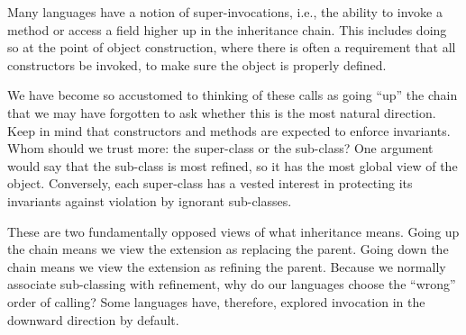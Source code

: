 
Many languages have a notion of super-invocations, i.e., the ability to invoke a
method or access a field higher up in the inheritance chain. This includes doing
so at the point of object construction, where there is often a requirement that
all constructors be invoked, to make sure the object is properly defined.

We have become so accustomed to thinking of these calls as going “up” the chain
that we may have forgotten to ask whether this is the most natural direction.
Keep in mind that constructors and methods are expected to enforce invariants.
Whom should we trust more: the super-class or the sub-class? One argument would
say that the sub-class is most refined, so it has the most global view of the
object. Conversely, each super-class has a vested interest in protecting its
invariants against violation by ignorant sub-classes.

These are two fundamentally opposed views of what inheritance means. Going up
the chain means we view the extension as replacing the parent. Going down the
chain means we view the extension as refining the parent. Because we normally
associate sub-classing with refinement, why do our languages choose the “wrong”
order of calling? Some languages have, therefore, explored invocation in the
downward direction by default.

